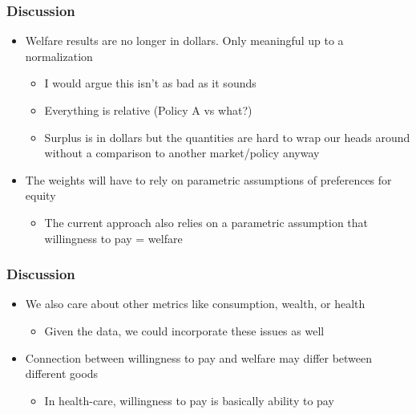 \documentclass{beamer}
\begin{document}
\begin{frame}
\frametitle{Discussion}
\begin{itemize}
	\item Welfare results are no longer in dollars. Only meaningful up to a normalization
	
	\begin{itemize}
		\item I would argue this isn't as bad as it sounds 
		\item Everything is relative (Policy A vs what?) 
		\item Surplus is in dollars but the quantities are hard to wrap our heads around without a comparison to another market/policy anyway
	\end{itemize}
	
	\item The weights will have to rely on parametric assumptions of preferences for equity 
	\begin{itemize}
		\item The current approach also relies on a parametric assumption that willingness to pay = welfare
	\end{itemize}
	

	
\end{itemize}



\end{frame}


\begin{frame}
\frametitle{Discussion }

\begin{itemize}
		\setlength{\itemsep}{5mm}
	\item We also care about other metrics like consumption, wealth, or health
\begin{itemize}
	\item Given the data, we could incorporate these issues as well
\end{itemize}


		\item Connection between willingness to pay and welfare may differ between different goods 
	\begin{itemize}
		\item In health-care, willingness to pay is basically ability to pay 
	\end{itemize}

\end{itemize}
\end{frame}
\end{document}
